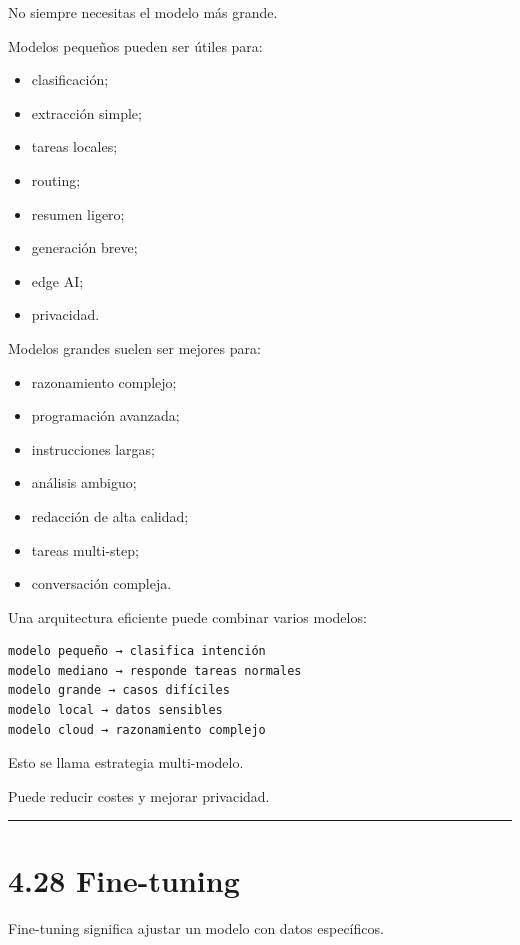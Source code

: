 No siempre necesitas el modelo más grande.

Modelos pequeños pueden ser útiles para:

\begin{itemize}
\tightlist
\item
  clasificación;
\item
  extracción simple;
\item
  tareas locales;
\item
  routing;
\item
  resumen ligero;
\item
  generación breve;
\item
  edge AI;
\item
  privacidad.
\end{itemize}

Modelos grandes suelen ser mejores para:

\begin{itemize}
\tightlist
\item
  razonamiento complejo;
\item
  programación avanzada;
\item
  instrucciones largas;
\item
  análisis ambiguo;
\item
  redacción de alta calidad;
\item
  tareas multi-step;
\item
  conversación compleja.
\end{itemize}

Una arquitectura eficiente puede combinar varios modelos:

\begin{lstlisting}
modelo pequeño → clasifica intención
modelo mediano → responde tareas normales
modelo grande → casos difíciles
modelo local → datos sensibles
modelo cloud → razonamiento complejo
\end{lstlisting}

Esto se llama estrategia multi-modelo.

Puede reducir costes y mejorar privacidad.

\begin{center}\rule{0.5\linewidth}{0.5pt}\end{center}

\section{4.28 Fine-tuning}\label{fine-tuning}

Fine-tuning significa ajustar un modelo con datos específicos.

